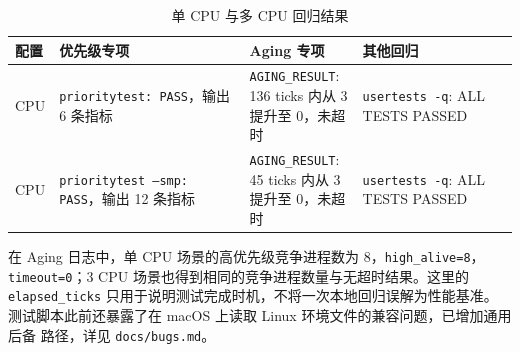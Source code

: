 \begin{table}[htbp]
  \centering
  \caption{单 CPU 与多 CPU 回归结果}
  \label{tab:scheduler-regression}
  \begin{tabularx}{\textwidth}{>{\raggedright\arraybackslash}p{1.5cm} >{\raggedright\arraybackslash}X >{\raggedright\arraybackslash}X >{\raggedright\arraybackslash}X}
    \toprule
    配置 & 优先级专项 & Aging 专项 & 其他回归 \\
    \midrule
    1 CPU & \texttt{prioritytest: PASS}，输出 6 条指标 & \tabincell{c}{\texttt{AGING\_RESULT}:\\136 ticks 内从 3\\提升至 0，未超时} & \texttt{usertests -q}: ALL TESTS PASSED \\
    3 CPU & \texttt{prioritytest --smp: PASS}，输出 12 条指标 & \tabincell{c}{\texttt{AGING\_RESULT}:\\45 ticks 内从 3\\提升至 0，未超时} & \texttt{usertests -q}: ALL TESTS PASSED \\
    \bottomrule
  \end{tabularx}
\end{table}

在 Aging 日志中，单 CPU 场景的高优先级竞争进程数为 8，\texttt{high\_alive=8}，
\texttt{timeout=0}；3 CPU 场景也得到相同的竞争进程数量与无超时结果。这里的
\texttt{elapsed\_ticks} 只用于说明测试完成时机，不将一次本地回归误解为性能基准。
测试脚本此前还暴露了在 macOS 上读取 Linux 环境文件的兼容问题，已增加通用后备
路径，详见 \texttt{docs/bugs.md}。
